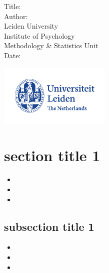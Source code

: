\documentclass{beamer}
\begin{document}
	
\AtBeginSection{
  \frame{\tableofcontents[sections={\thesection}]}
}

\begin{frame}
\begin{center}
{\large Title: }\\
 \vspace*{1cm}
{\small Author: }\\ 
 \vspace*{0.3cm}
{\small Leiden University\\
 Institute of Psychology\\
 Methodology \& Statistics Unit\\
\vspace*{0.3cm}
Date: }

 \includegraphics[width=0.4\textwidth]{LogoUniversityLeiden}
\end{center}
\end{frame}

\section{section title 1}
\begin{frame} %
	\begin{itemize}
		\item 
		\item 
		\item 
	\end{itemize}

\end{frame}

\subsection{subsection title 1} 
\begin{frame}
	\begin{itemize}
		\item 
		\item 
		\item 
	\end{itemize}
\end{frame}
\end{document}
